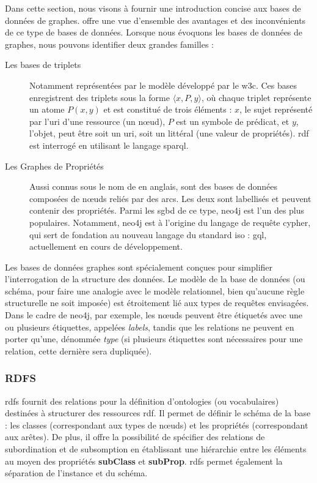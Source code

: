 Dans cette section, nous visons à fournir une introduction concise aux bases de données de graphes.
\cite{pokornyGraphDatabasesTheir2015} offre une vue d'ensemble des avantages et des inconvénients de ce type de bases de données.
Lorsque nous évoquons les bases de données de graphes, nous pouvons identifier deux grandes familles :
\begin{description}
    \item[Les bases de triplets] Notamment représentées par le modèle  développé par le \gls{w3c}.
          Ces bases enregistrent des triplets sous la forme $\langle x, P, y \rangle$, où chaque triplet représente un atome $P(x, y)$ et est constitué de trois éléments : $x$, le sujet représenté par l'\gls{uri} d'une ressource (un nœud), $P$ est un symbole de prédicat, et $y$, l'objet, peut être soit un \gls{uri}, soit un littéral (une valeur de propriétés).
          \gls{rdf} est interrogé en utilisant le langage \gls{sparql}.

    \item[Les Graphes de Propriétés] Aussi connus sous le nom de  en anglais, sont des bases de données composées de nœuds reliés par des arcs. Les deux sont labellisés et peuvent contenir des propriétés.
          Parmi les \gls{sgbd} de ce type, \gls{neo4j} est l'un des plus populaires.
          Notamment, \gls{neo4j} est à l'origine du langage de requête \gls{cypher}, qui sert de fondation au nouveau langage du standard \gls{iso} : \gls{gql}, actuellement en cours de développement.
\end{description}

Les bases de données graphes sont spécialement conçues pour simplifier l'interrogation de la structure des données.
Le modèle de la base de données (ou schéma, pour faire une analogie avec le modèle relationnel, bien qu'aucune règle structurelle ne soit imposée) est étroitement lié aux types de requêtes envisagées.
Dans le cadre de \gls{neo4j}, par exemple, les nœuds peuvent être étiquetés avec une ou plusieurs étiquettes, appelées \emph{labels}, tandis que les relations ne peuvent en porter qu'une, dénommée \emph{type} (si plusieurs étiquettes sont nécessaires pour une relation, cette dernière sera dupliquée).

\subsubsection{RDFS}
\gls{rdfs} fournit des relations pour la définition d'ontologies (ou vocabulaires) destinées à structurer des ressources \gls{rdf}.
Il permet de définir le schéma de la base : les classes (correspondant aux types de nœuds) et les propriétés (correspondant aux arêtes).
De plus, il offre la possibilité de spécifier des relations de subordination et de subsomption en établissant une hiérarchie entre les éléments au moyen des propriétés \textbf{subClass} et \textbf{subProp}.
\gls{rdfs} permet également la séparation de l'instance et du schéma.

